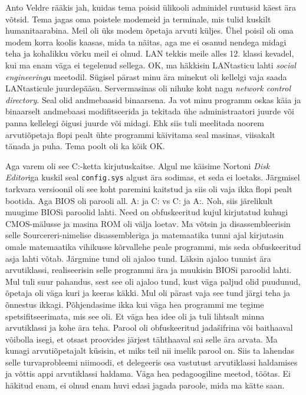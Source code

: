 Anto Veldre rääkis jah, kuidas tema poisid
ülikooli adminidel ruutusid käest ära võtsid. Tema jagas oma poistele
modemeid ja terminale, mis tulid kuskilt humanitaarabina. Meil oli üks modem
õpetaja arvuti küljes. Ühel poisil oli oma modem korra koolis kaasas, mida ta
näitas, aga me ei osanud nendega midagi teha ja kohalikku võrku meil ei olnud.
LAN tekkis meile alles 12.
klassi kevadel, kui ma enam väga ei tegelenud sellega. OK, ma häkkisin
LANtasticu
lahti \emph{social engineering}u meetodil. Sügisel pärast minu ära minekut oli
kellelgi vaja saada LANtasticule juurdepääsu. Servermasinas oli nihuke koht
nagu \emph{network control directory}. Seal olid andmebaasid binaarsena. Ja vot
minu programm oskas käia ja binaarselt andmebaasi modifitseerida ja tekitada
ühe administraatori juurde või panna kellelegi õigusi juurde või midagi. Ehk
siis tuli meelitada noorem arvutiõpetaja flopi pealt ühte programmi käivitama
seal masinas, viisakalt tänada ja puha. Tema poolt oli ka kõik OK.

Aga varem oli see C:-ketta kirjutuskaitse. Algul me käisime Nortoni \emph{Disk
Editor}iga kuskil seal \verb|config.sys| algust ära sodimas, et seda ei
loetaks. Järgmisel tarkvara versioonil oli see koht paremini kaitstud ja siis
oli vaja ikka flopi pealt bootida. Aga BIOS oli parooli all. A: ja C: vs C: ja
A:. Noh, siis järelikult muugime BIOSi paroolid lahti. Need on obfuskeeritud
kujul kirjutatud kuhugi CMOS-mälusse ja masina ROM oli välja loetav. Ma võtsin
ja disassembleerisin selle Sourcereri-nimelise disassembleriga ja matemaatika
tunni ajal kirjutasin omale matemaatika vihikusse kõrvallehe peale programmi,
mis seda obfuskeeritud asja lahti võtab. Järgmine tund oli ajaloo tund. Läksin
ajaloo tunnist ära arvutiklassi, realiseerisin selle programmi ära ja muukisin
BIOSi paroolid lahti. Mul tuli suur pahandus, sest see oli ajaloo tund, kust
väga paljud olid puudunud, õpetaja oli väga kuri ja keeras käkki. Mul oli
pärast vaja see tund järgi teha ja õnnestus ikkagi. Põhjendasime ikka kui väga
hea programmi me tegime spetsifitseerimata, mis see oli. Et väga hea idee oli
ja tuli lihtsalt minna arvutiklassi ja kohe ära teha. Parool oli obfuskeeritud
jadašifrina või baithaaval võibolla isegi, et otsast proovides järjest
tähthaaval sai selle ära arvata. Ma kunagi arvutiõpetajalt küsisin, et miks
teil nii imelik parool on. Siis ta lahendas selle turvaprobleemi niimoodi, et
delegeeris osa vastutust arvutiklassi haldamises ja võttis appi arvutiklassi
haldama. Väga hea pedagoogiline meetod, töötas. Ei häkitud enam, ei olnud enam
huvi edasi jagada paroole, mida ma kätte saan.

